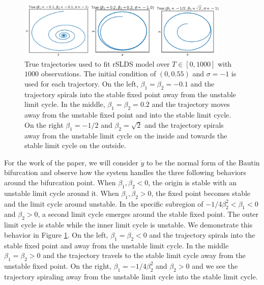 \begin{figure}
    \centering
    \includegraphics[width=0.9\textwidth,height=\textwidth,keepaspectratio]{./Figures/bautin-true.png}
    \caption{True trajectories used to fit rSLDS model over $T\in[0,1000]$ with $1000$ observations. The initial condition of $(0,0.55)$ and $\sigma = -1$ is used for each trajectory. On the left, $\beta_1 = \beta_2 = -0.1$ and the trajectory spirals into the stable fixed point away from the unstable limit cycle. In the middle, $\beta_1 = \beta_2 = 0.2$ and the trajectory moves away from the unstable fixed point and into the stable limit cycle. On the right $\beta_1 = -1/2$ and $\beta_2 = \sqrt{2}$ and the trajectory spirals away from the unstable limit cycle on the inside and towards the stable limit cycle on the outside. }
    \label{bautin-true}
\end{figure}


For the work of the paper, we will consider $\dot{y}$ to be the normal form of the Bautin bifurcation and observe how the system handles the three following behaviors around the bifurcation point. When $\beta_1,\beta_2 < 0$, the origin is stable with an unstable limit cycle around it. When $\beta_1,\beta_2 > 0$, the fixed point becomes stable and the limit cycle around unstable. In the specific subregion of $-1/4 \beta_2^2 < \beta_1 < 0$ and $\beta_2>0$, a second limit cycle emerges around the stable fixed point. The outer limit cycle is stable while the inner limit cycle is unstable. We demonstrate this behavior in Figure \ref{bautin-true}. On the left, $\beta_1 = \beta_2 < 0$ and the trajectory spirals into the stable fixed point and away from the unstable limit cycle. In the middle $\beta_1 = \beta_2 > 0$ and the trajectory travels to the stable limit cycle away from the unstable fixed point. On the right, $\beta_1 = -1/4 \beta_2^2$ and $\beta_2 > 0$ and we see the trajectory spiraling away from the unstable limit cycle into the stable limit cycle. 

